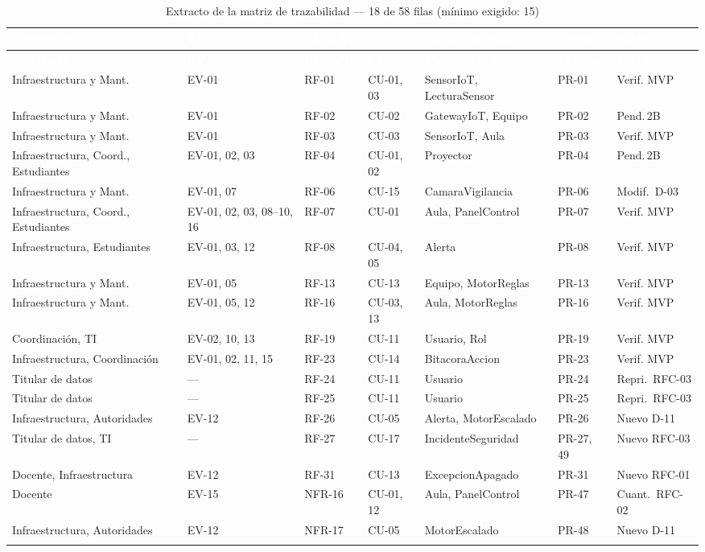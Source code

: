 \documentclass[11pt,letterpaper]{article}
\newcommand{\thead}[1]{\cellcolor{uteqverde}\textcolor{white}{\textbf{#1}}}
\begin{document}
\small
\begin{longtable}{|p{3.4cm}|p{1.2cm}|p{1.6cm}|p{1.4cm}|p{2.8cm}|p{1.3cm}|p{2.0cm}|}
\hline
\thead{Stakeholder} & \thead{EV} & \thead{RF/RNF} & \thead{CU} & \thead{Clase / Módulo} & \thead{Prueba} & \thead{Estado} \\ \hline
\endfirsthead
\hline
\thead{Stakeholder} & \thead{EV} & \thead{RF/RNF} & \thead{CU} & \thead{Clase / Módulo} & \thead{Prueba} & \thead{Estado} \\ \hline
\endhead
Infraestructura y Mant. & EV-01 & RF-01 & CU-01, 03 & SensorIoT, LecturaSensor & PR-01 & Verif. MVP \\ \hline
Infraestructura y Mant. & EV-01 & RF-02 & CU-02 & GatewayIoT, Equipo & PR-02 & Pend.\,2B \\ \hline
Infraestructura y Mant. & EV-01 & RF-03 & CU-03 & SensorIoT, Aula & PR-03 & Verif. MVP \\ \hline
Infraestructura, Coord., Estudiantes & EV-01, 02, 03 & RF-04 & CU-01, 02 & Proyector & PR-04 & Pend.\,2B \\ \hline
Infraestructura y Mant. & EV-01, 07 & RF-06 & CU-15 & CamaraVigilancia & PR-06 & Modif.\ D-03 \\ \hline
Infraestructura, Coord., Estudiantes & EV-01, 02, 03, 08--10, 16 & RF-07 & CU-01 & Aula, PanelControl & PR-07 & Verif. MVP \\ \hline
Infraestructura, Estudiantes & EV-01, 03, 12 & RF-08 & CU-04, 05 & Alerta & PR-08 & Verif. MVP \\ \hline
Infraestructura y Mant. & EV-01, 05 & RF-13 & CU-13 & Equipo, MotorReglas & PR-13 & Verif. MVP \\ \hline
Infraestructura y Mant. & EV-01, 05, 12 & RF-16 & CU-03, 13 & Aula, MotorReglas & PR-16 & Verif. MVP \\ \hline
Coordinación, TI & EV-02, 10, 13 & RF-19 & CU-11 & Usuario, Rol & PR-19 & Verif. MVP \\ \hline
Infraestructura, Coordinación & EV-01, 02, 11, 15 & RF-23 & CU-14 & BitacoraAccion & PR-23 & Verif. MVP \\ \hline
Titular de datos & --- & RF-24 & CU-11 & Usuario & PR-24 & Repri.\ RFC-03 \\ \hline
Titular de datos & --- & RF-25 & CU-11 & Usuario & PR-25 & Repri.\ RFC-03 \\ \hline
Infraestructura, Autoridades & EV-12 & RF-26 & CU-05 & Alerta, MotorEscalado & PR-26 & Nuevo D-11 \\ \hline
Titular de datos, TI & --- & RF-27 & CU-17 & IncidenteSeguridad & PR-27, 49 & Nuevo RFC-03 \\ \hline
Docente, Infraestructura & EV-12 & RF-31 & CU-13 & ExcepcionApagado & PR-31 & Nuevo RFC-01 \\ \hline
Docente & EV-15 & NFR-16 & CU-01, 12 & Aula, PanelControl & PR-47 & Cuant.\ RFC-02 \\ \hline
Infraestructura, Autoridades & EV-12 & NFR-17 & CU-05 & MotorEscalado & PR-48 & Nuevo D-11 \\ \hline
\caption{Extracto de la matriz de trazabilidad --- 18 de 58 filas (mínimo exigido: 15)}
\end{longtable}
\normalsize
\end{document}
